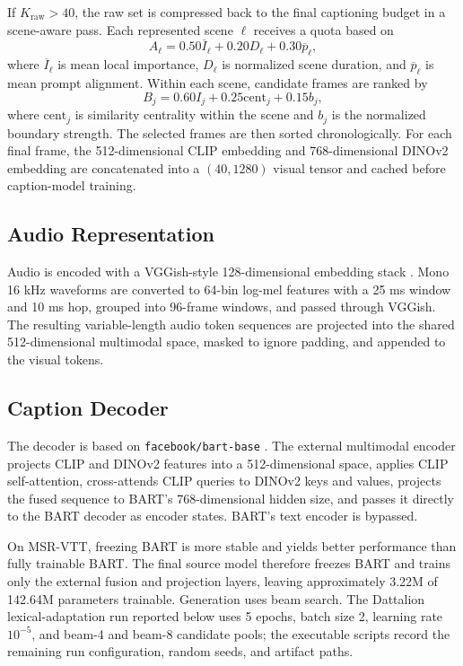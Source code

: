 \documentclass[pdflatex,sn-mathphys-num]{sn-jnl}
\theoremstyle{thmstyleone}
\theoremstyle{thmstyletwo}
\theoremstyle{thmstylethree}
\begin{document}
If $K_{\mathrm{raw}}>40$, the raw set is compressed back to the final captioning budget in a scene-aware pass. Each represented scene $\ell$ receives a quota based on
\[
    A_\ell =
    0.50\overline{I}_\ell
    + 0.20D_\ell
    + 0.30\overline{p}_\ell ,
\]
where $\overline{I}_\ell$ is mean local importance, $D_\ell$ is normalized scene duration, and $\overline{p}_\ell$ is mean prompt alignment. Within each scene, candidate frames are ranked by
\[
    B_j =
    0.60I_j + 0.25\mathrm{cent}_j + 0.15b_j ,
\]
where $\mathrm{cent}_j$ is similarity centrality within the scene and $b_j$ is the normalized boundary strength. The selected frames are then sorted chronologically. For each final frame, the 512-dimensional CLIP embedding and 768-dimensional DINOv2 embedding are concatenated into a $(40,1280)$ visual tensor and cached before caption-model training.

\subsection{Audio Representation}
Audio is encoded with a VGGish-style 128-dimensional embedding stack \cite{DBLP_VGGish}. Mono 16 kHz waveforms are converted to 64-bin log-mel features with a 25 ms window and 10 ms hop, grouped into 96-frame windows, and passed through VGGish. The resulting variable-length audio token sequences are projected into the shared 512-dimensional multimodal space, masked to ignore padding, and appended to the visual tokens.

\subsection{Caption Decoder}
The decoder is based on \texttt{facebook/bart-base} \cite{lewis2020bart}. The external multimodal encoder projects CLIP and DINOv2 features into a 512-dimensional space, applies CLIP self-attention, cross-attends CLIP queries to DINOv2 keys and values, projects the fused sequence to BART's 768-dimensional hidden size, and passes it directly to the BART decoder as encoder states. BART's text encoder is bypassed.

On MSR-VTT, freezing BART is more stable and yields better performance than fully trainable BART. The final source model therefore freezes BART and trains only the external fusion and projection layers, leaving approximately 3.22M of 142.64M parameters trainable. Generation uses beam search. The Dattalion lexical-adaptation run reported below uses 5 epochs, batch size 2, learning rate $10^{-5}$, and beam-4 and beam-8 candidate pools; the executable scripts record the remaining run configuration, random seeds, and artifact paths.
\end{document}

